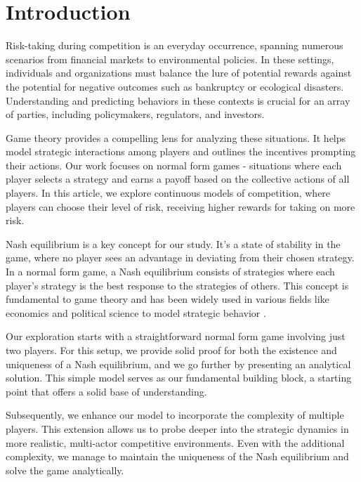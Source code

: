 \documentclass[preprint,12pt,authoryear]{elsarticle}
\theoremstyle{definition}
\begin{document}
\section{Introduction}
\label{sec:introduction}

Risk-taking during competition is an everyday occurrence, spanning numerous scenarios from financial markets to environmental policies. In these settings, individuals and organizations must balance the lure of potential rewards against the potential for negative outcomes such as bankruptcy or ecological disasters. Understanding and predicting behaviors in these contexts is crucial for an array of parties, including policymakers, regulators, and investors.

Game theory provides a compelling lens for analyzing these situations. It helps model strategic interactions among players and outlines the incentives prompting their actions. Our work focuses on normal form games - situations where each player selects a strategy and earns a payoff based on the collective actions of all players. In this article, we explore continuous models of competition, where players can choose their level of risk, receiving higher rewards for taking on more risk.

Nash equilibrium is a key concept for our study. It's a state of stability in the game, where no player sees an advantage in deviating from their chosen strategy. In a normal form game, a Nash equilibrium consists of strategies where each player's strategy is the best response to the strategies of others. This concept is fundamental to game theory and has been widely used in various fields like economics and political science to model strategic behavior \citep{moulin1986game, varoufakis2008game}.

Our exploration starts with a straightforward normal form game involving just two players. For this setup, we provide solid proof for both the existence and uniqueness of a Nash equilibrium, and we go further by presenting an analytical solution. This simple model serves as our fundamental building block, a starting point that offers a solid base of understanding.

Subsequently, we enhance our model to incorporate the complexity of multiple players. This extension allows us to probe deeper into the strategic dynamics in more realistic, multi-actor competitive environments. Even with the additional complexity, we manage to maintain the uniqueness of the Nash equilibrium and solve the game analytically.
\end{document}
